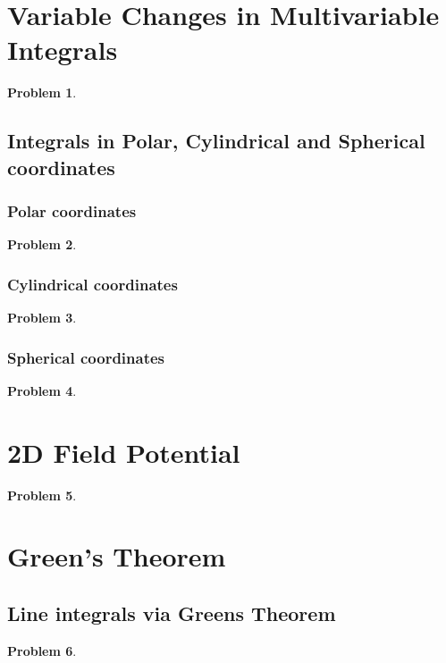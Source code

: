 \documentclass{article}
\newtheorem{problem}{Problem}
\begin{document}
\section{Variable Changes in Multivariable Integrals}
\begin{problem}

\end{problem}


\subsection{Integrals in Polar, Cylindrical and Spherical coordinates}
\subsubsection{Polar coordinates}
\begin{problem}

\end{problem}
\subsubsection{Cylindrical coordinates}
\begin{problem}

\end{problem}
\subsubsection{Spherical coordinates}
\begin{problem}

\end{problem}
\section{2D Field Potential}
\begin{problem}

\end{problem}
\section{Green's Theorem}
\subsection{Line integrals via Greens Theorem}
\begin{problem}

\end{problem}
\end{document}
